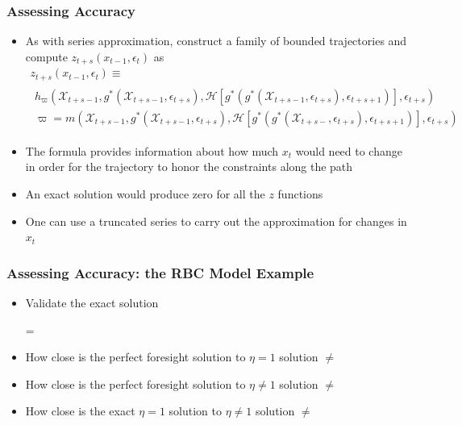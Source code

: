 \documentclass[letter]{beamer}
\begin{document}
\begin{frame}
  \frametitle{Assessing Accuracy}
{\small

  \begin{itemize}
  \item As with series approximation,
 construct a family of bounded trajectories and compute
$  z_{t+s}(x_{t-1},\epsilon_t)$ as  %
{
\begin{gather}
  z_{t+s}(x_{t-1},\epsilon_t) \equiv\\
   \begin{split}
 h_{\varpi}(\mathcal{X}_{t+s-1},g^\ast(\mathcal{X}_{t+s-1},\epsilon_{t+s}),\mathcal{H}[g^\ast(g^\ast(\mathcal{X}_{t+s-1},\epsilon_{t+s}),\epsilon_{t+s+1})],\epsilon_{t+s}) \label{theProblem} \\
\varpi= m(\mathcal{X}_{t+s-1},g^\ast(\mathcal{X}_{t+s-1},\epsilon_{t+s}),\mathcal{H}[g^\ast(g^\ast(\mathcal{X}_{t+s-},\epsilon_{t+s}),\epsilon_{t+s+1})],\epsilon_{t+s}) 
   \end{split}
  \end{gather}
}
\item The formula provides information about how much $x_{t}$ would need
to change in order for the trajectory to honor the constraints along the path
\item An exact solution would produce zero for all the $z$ functions
\item One can use a truncated series to carry out the approximation for changes in $x_t$
  \end{itemize}
}
\end{frame}

\begin{frame}
  \frametitle{Assessing Accuracy: the RBC Model Example}
  \begin{itemize}
  \item Validate the exact solution

 =
  \item How close is the perfect foresight solution to $\eta=1$ solution
 $\ne$
  \item How close is the perfect foresight solution to $\eta \ne 1$ solution
 $\ne$
  \item How close is the exact $\eta=1$  solution to $\eta \ne 1$ solution
 $\ne$
  \end{itemize}
\end{frame}
\end{document}
